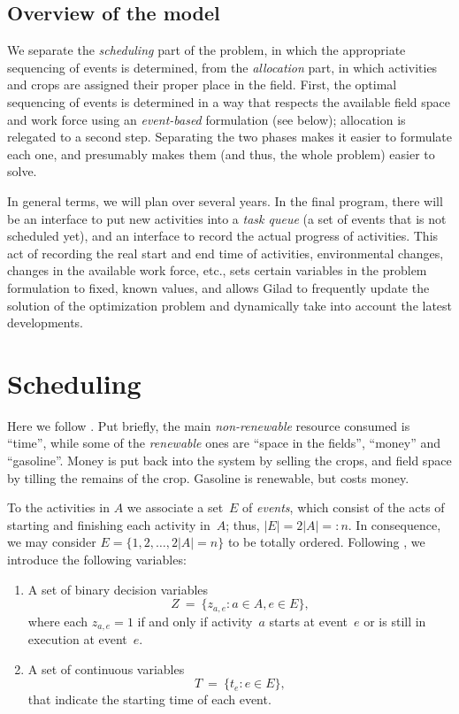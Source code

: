 \documentclass[11pt]{amsart}
\numberwithin{equation}{section}
\begin{document}
\subsection{Overview of the model}


We separate the \emph{scheduling} part of the problem, in which the
appropriate sequencing of events is determined, from the
\emph{allocation} part, in which activities and crops are assigned
their proper place in the field. First, the optimal sequencing of
events is determined in a way that respects the available field space
and work force using an \emph{event-based} formulation (see below);
allocation is relegated to a second step. Separating the two phases
makes it easier to formulate each one, and presumably makes them (and
thus, the whole problem) easier to solve.

In general terms, we will plan over several years. In the final
program, there will be an interface to put new activities into a
\emph{task queue} (a set of events that is not scheduled yet), and an
interface to record the actual progress of activities. This act of
recording the real start and end time of activities, environmental
changes, changes in the available work force, etc., sets certain
variables in the problem formulation to fixed, known values, and
allows Gilad to frequently update the solution of the optimization
problem and dynamically take into account the latest developments.


\section{Scheduling}

Here we follow \cite{artigues-etal11}. Put briefly, the main
\emph{non-renewable} resource consumed is ``time'', while some of the
\emph{renewable} ones are ``space in the fields'', ``money'' and
``gasoline''. Money is put back into the system by selling the crops,
and field space by tilling the remains of the crop. Gasoline is
renewable, but costs money.

To the activities in $A$ we associate a set~$E$ of \emph{events},
which consist of the acts of starting and finishing each activity
in~$A$; thus, $|E|=2|A|=:n$. In consequence, we may consider
$E=\{1,2,\dots, 2|A|=n\}$ to be totally ordered.  Following
\cite{artigues-etal11}, we introduce the following variables:

\begin{enumerate}
\item A set of binary decision variables 
  \[
     Z
     \ = \
     \big\{z_{a,e}: a\in A, e\in E\big\},
  \]
  where each $z_{a,e}=1$ if and only if activity~$a$ starts at
  event~$e$ or is still in execution at event~$e$.

\smallskip
\item A set of continuous variables
  \[
     T
     \ = \
     \big\{t_e : e\in E\big\}, 
  \]
  that indicate the starting time of each event.
\end{enumerate}
\end{document}
